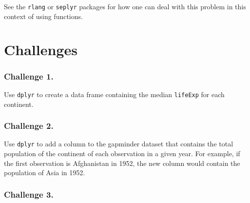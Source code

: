 \documentclass[]{book}
\newenvironment{Shaded}{\begin{snugshade}}{\end{snugshade}}
\newcommand{\KeywordTok}[1]{\textcolor[rgb]{0.13,0.29,0.53}{\textbf{#1}}}
\newcommand{\DataTypeTok}[1]{\textcolor[rgb]{0.13,0.29,0.53}{#1}}
\newcommand{\StringTok}[1]{\textcolor[rgb]{0.31,0.60,0.02}{#1}}
\newcommand{\ControlFlowTok}[1]{\textcolor[rgb]{0.13,0.29,0.53}{\textbf{#1}}}
\newcommand{\OperatorTok}[1]{\textcolor[rgb]{0.81,0.36,0.00}{\textbf{#1}}}
\newcommand{\NormalTok}[1]{#1}
\begin{document}
\begin{Shaded}
\end{Shaded}

See the \texttt{rlang} or \texttt{seplyr} packages for how one can deal
with this problem in this context of using functions.

\section{Challenges}\label{challenges-11}

\subsubsection*{Challenge 1.}\label{challenge-1.-6}

Use \texttt{dplyr} to create a data frame containing the median
\texttt{lifeExp} for each continent.

\subsubsection*{Challenge 2.}\label{challenge-2.-6}

Use \texttt{dplyr} to add a column to the gapminder dataset that
contains the total population of the continent of each observation in a
given year. For example, if the first observation is Afghanistan in
1952, the new column would contain the population of Asia in 1952.

\subsubsection*{Challenge 3.}\label{challenge-3.-4}
\end{document}
